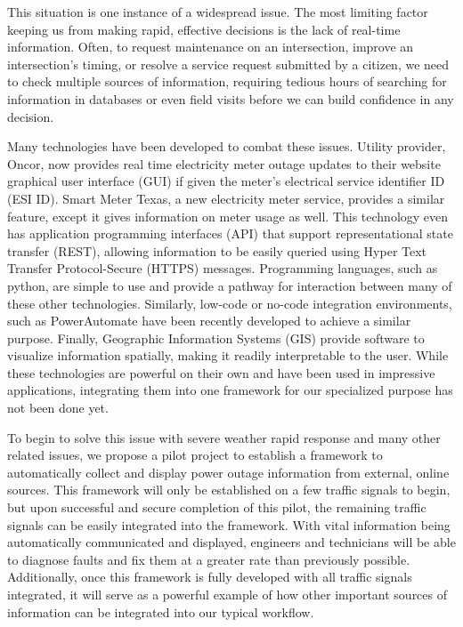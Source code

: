 \documentclass[letterpaper, notitlepage]{report}
\begin{document}
This situation is one instance of a widespread issue. The most limiting factor keeping us from making rapid, effective decisions is the lack of real-time information. Often, to request maintenance on an intersection, improve an intersection's timing, or resolve a service request submitted by a citizen, we need to check multiple sources of information, requiring tedious hours of searching for information in databases or even field visits before we can build confidence in any decision. 

Many technologies have been developed to combat these issues. Utility provider, Oncor, now provides real time electricity meter outage updates to their website graphical user interface (GUI) if given the meter's electrical service identifier ID (ESI ID). Smart Meter Texas, a new electricity meter service, provides a similar feature, except it gives information on meter usage as well. This technology even has application programming interfaces (API) that support representational state transfer (REST), allowing information to be easily queried using Hyper Text Transfer Protocol-Secure (HTTPS) messages. Programming languages, such as python, are simple to use and provide a pathway for interaction between many of these other technologies. Similarly, low-code or no-code integration environments, such as PowerAutomate have been recently developed to achieve a similar purpose. Finally, Geographic Information Systems (GIS) provide software to visualize information spatially, making it readily interpretable to the user. While these technologies are powerful on their own and have been used in impressive applications, integrating them into one framework for our specialized purpose has not been done yet.

To begin to solve this issue with severe weather rapid response and many other related issues, we propose a pilot project to establish a framework to automatically collect and display power outage information from external, online sources. This framework will only be established on a few traffic signals to begin, but upon successful and secure completion of this pilot, the remaining traffic signals can be easily integrated into the framework. With vital information being automatically communicated and displayed, engineers and technicians will be able to diagnose faults and fix them at a greater rate than previously possible. Additionally, once this framework is fully developed with all traffic signals integrated, it will serve as a powerful example of how other important sources of information can be integrated into our typical workflow. 
\end{document}
